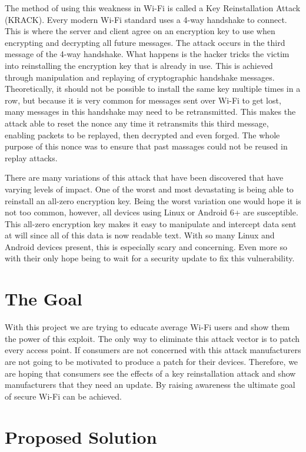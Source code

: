 \documentclass[11pt,]{article}
\begin{document}
The method of using this weakness in Wi-Fi is called a Key
Reinstallation Attack (KRACK). Every modern Wi-Fi standard uses a 4-way
handshake to connect. This is where the server and client agree on an
encryption key to use when encrypting and decrypting all future
messages. The attack occurs in the third message of the 4-way handshake.
What happens is the hacker tricks the victim into reinstalling the
encryption key that is already in use. This is achieved through
manipulation and replaying of cryptographic handshake messages.
Theoretically, it should not be possible to install the same key
multiple times in a row, but because it is very common for messages sent
over Wi-Fi to get lost, many messages in this handshake may need to be
retransmitted. This makes the attack able to reset the nonce any time it
retransmits this third message, enabling packets to be replayed, then
decrypted and even forged. The whole purpose of this nonce was to ensure
that past massages could not be reused in replay attacks.

There are many variations of this attack that have been discovered that
have varying levels of impact. One of the worst and most devastating is
being able to reinstall an all-zero encryption key. Being the worst
variation one would hope it is not too common, however, all devices
using Linux or Android 6+ are susceptible. This all-zero encryption key
makes it easy to manipulate and intercept data sent at will since all of
this data is now readable text. With so many Linux and Android devices
present, this is especially scary and concerning. Even more so with
their only hope being to wait for a security update to fix this
vulnerability.

\section{The Goal}\label{the-goal}

With this project we are trying to educate average Wi-Fi users and show
them the power of this exploit. The only way to eliminate this attack
vector is to patch every access point. If consumers are not concerned
with this attack manufacturers are not going to be motivated to produce
a patch for their devices. Therefore, we are hoping that consumers see
the effects of a key reinstallation attack and show manufacturers that
they need an update. By raising awareness the ultimate goal of secure
Wi-Fi can be achieved.

\section{Proposed Solution}\label{proposed-solution}
\end{document}

